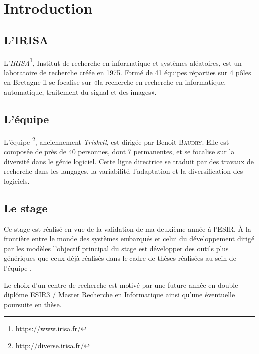 \section*{Introduction} %
{}

\subsection{L'IRISA}

L'\emph{IRISA}\footnote{https://www.irisa.fr/}, Institut de recherche en informatique et systèmes aléatoires, est un laboratoire de recherche créée en 1975. Formé de 41 équipes réparties sur 4 pôles en Bretagne il se focalise sur «la recherche en recherche en informatique, automatique, traitement du signal et des images».

\subsection{L'équipe \diver}

L'équipe \diver\footnote{http://diverse.irisa.fr/}, anciennement \emph{Triskell}, est dirigée par Benoit \textsc{Baudry}. Elle est composée de près de 40 personnes, dont 7 permanentes, et se focalise sur la diversité dans le génie logiciel. Cette ligne directrice se traduit par des travaux de recherche dans les langages, la variabilité, l'adaptation et la diversification des logiciels.

\subsection{Le stage}
Ce stage est réalisé en vue de la validation de ma deuxième année à l'ESIR. À la frontière entre le monde des systèmes embarqués et celui du développement dirigé par les modèles l'objectif principal du stage est développer des outils plus génériques que ceux déjà réalisés dans le cadre de thèses réalisées au sein de l'équipe \diver.

Le choix d'un centre de recherche est motivé par une future année en double diplôme ESIR3 / Master Recherche en Informatique ainsi qu'une éventuelle poursuite en thèse.